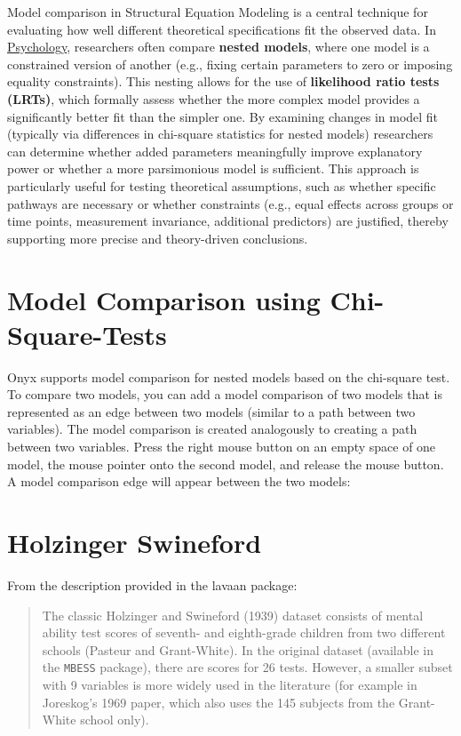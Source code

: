 \documentclass[
  letterpaper,
  DIV=11,
  numbers=noendperiod]{scrreprt}
\begin{document}
Model comparison in Structural Equation Modeling is a central technique
for evaluating how well different theoretical specifications fit the
observed data. In \ul{Psychology}, researchers often compare
\textbf{nested models}, where one model is a constrained version of
another (e.g., fixing certain parameters to zero or imposing equality
constraints). This nesting allows for the use of \textbf{likelihood
ratio tests (LRTs)}, which formally assess whether the more complex
model provides a significantly better fit than the simpler one. By
examining changes in model fit (typically via differences in chi-square
statistics for nested models) researchers can determine whether added
parameters meaningfully improve explanatory power or whether a more
parsimonious model is sufficient. This approach is particularly useful
for testing theoretical assumptions, such as whether specific pathways
are necessary or whether constraints (e.g., equal effects across groups
or time points, measurement invariance, additional predictors) are
justified, thereby supporting more precise and theory-driven
conclusions.

\section{Model Comparison using
Chi-Square-Tests}\label{model-comparison-using-chi-square-tests}

Onyx supports model comparison for nested models based on the chi-square
test. To compare two models, you can add a model comparison of two
models that is represented as an edge between two models (similar to a
path between two variables). The model comparison is created analogously
to creating a path between two variables. Press the right mouse button
on an empty space of one model, the mouse pointer onto the second model,
and release the mouse button. A model comparison edge will appear
between the two models:

\section{Holzinger Swineford}\label{holzinger-swineford}

From the description provided in the lavaan package:

\begin{quote}
The classic Holzinger and Swineford (1939) dataset consists of mental
ability test scores of seventh- and eighth-grade children from two
different schools (Pasteur and Grant-White). In the original dataset
(available in the \texttt{MBESS} package), there are scores for 26
tests. However, a smaller subset with 9 variables is more widely used in
the literature (for example in Joreskog's 1969 paper, which also uses
the 145 subjects from the Grant-White school only).
\end{quote}
\end{document}
